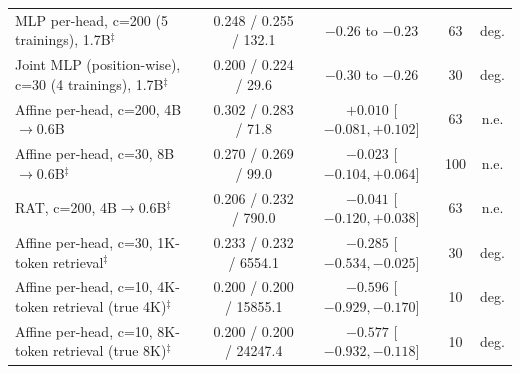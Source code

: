 \documentclass{article} %
\begin{document}
\begin{table}[t]
\begin{tabular}{lcccc}
MLP per-head, c=200 (5 trainings), 1.7B$^\ddagger$ & 0.248 / 0.255 / 132.1 & $-0.26$ to $-0.23$ & 63 & deg. \\
Joint MLP (position-wise), c=30 (4 trainings), 1.7B$^\ddagger$ & 0.200 / 0.224 / 29.6 & $-0.30$ to $-0.26$ & 30 & deg. \\
Affine per-head, c=200, 4B$\to$0.6B & 0.302 / 0.283 / 71.8 & $+0.010$ [$-0.081, +0.102$] & 63 & n.e. \\
Affine per-head, c=30, 8B$\to$0.6B$^\ddagger$ & 0.270 / 0.269 / 99.0 & $-0.023$ [$-0.104, +0.064$] & 100 & n.e. \\
RAT, c=200, 4B$\to$0.6B$^\ddagger$ & 0.206 / 0.232 / 790.0 & $-0.041$ [$-0.120, +0.038$] & 63 & n.e. \\
Affine per-head, c=30, 1K-token retrieval$^\ddagger$ & 0.233 / 0.232 / 6554.1 & $-0.285$ [$-0.534, -0.025$] & 30 & deg. \\
Affine per-head, c=10, 4K-token retrieval (true 4K)$^\ddagger$ & 0.200 / 0.200 / 15855.1 & $-0.596$ [$-0.929, -0.170$] & 10 & deg. \\
Affine per-head, c=10, 8K-token retrieval (true 8K)$^\ddagger$ & 0.200 / 0.200 / 24247.4 & $-0.577$ [$-0.932, -0.118$] & 10 & deg. \\
\bottomrule
\end{tabular}
\end{table}
\end{document}
